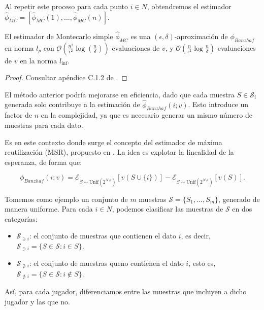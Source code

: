 Al repetir este proceso para cada punto $i \in N$, obtendremos
el estimador $\hat{\phi}_{MC} = [\hat{\phi}_{MC}(1),\dots,
\hat{\phi}_{MC}(n)]$.


\begin{theorem}
  El estimador de Montecarlo simple $\hat{\phi}_{MC}$
  es una $(\epsilon,\delta)$-aproximación de $\phi_{Banzhaf}$
  en norma $l_p$ con $\mathcal{O}(\frac{n^2}{\epsilon^2}
  \log(\frac{n}{\delta}))$ evaluaciones de $v$, y
  $\mathcal{O}(\frac{n}{\epsilon^2}
  \log{\frac{n}{\delta}})$ evaluaciones de $v$ en la norma
  $l_{\inf}$.
\end{theorem}

\begin{proof}
  Consultar apéndice C.1.2 de \cite{dataBanzhaf}.
\end{proof}

El método anterior podría mejorarse en eficiencia,
dado que cada muestra $S \in \mathcal{S}_i$ generada
solo contribuye a la estimación de
$\hat{\phi}_{Banzhaf}(i;v)$. Esto introduce un
factor de $n$ en la complejidad, ya que es necesario
generar un mismo número de muestras para cada dato.

Es en este contexto donde surge el concepto del
estimador de máxima reutilización (MSR), propuesto
en \cite{dataBanzhaf}. La idea es explotar la
linealidad de la esperanza, de forma que:

\begin{equation}
  \label{maximumSampleReuse}
  \phi_{Banzhaf}(i;v) = \mathcal{E}_{S \sim \text{Unif}(2^{N\setminus i})}
  [v(S \cup \{i\})] - 
  \mathcal{E}_{S \sim \text{Unif}(2^{N\setminus i})}
  [v(S)].
\end{equation}

Tomemos como ejemplo un conjunto de $m$ muestras
$\mathcal{S} = \{S_1,\dots,S_m\}$, generado de manera
uniforme. Para cada $i \in N$, podemos clasificar las
muestras de $\mathcal{S}$ en dos categorías:

\begin{itemize}
  \item $\mathcal{S}_{\ni i}$: el conjunto de muestras
  que contienen el dato $i$, es decir,
  $\mathcal{S}_{\ni i} = \{S \in \mathcal{S}: i \in S\}$.
  \item $\mathcal{S}_{\not \ni  i}$: el conjunto de muestras
  queno contienen el dato $i$, esto es,
  $\mathcal{S}_{\not \ni  i} = \{S \in \mathcal{S}: i \not
  \in S\}$.
\end{itemize}

Así, para cada jugador, diferenciamos entre las muestras
que incluyen a dicho jugador y las que no.

